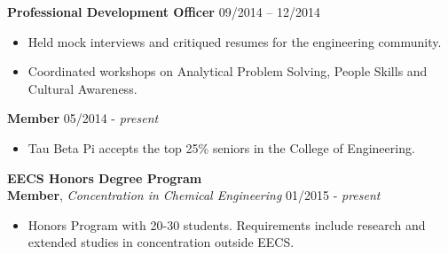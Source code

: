 \documentclass{article}
\begin{document}
\noindent
\textbf{Professional Development Officer}
\hfill 09/2014 -- 12/2014
\begin{itemize}
\vspace{-2.5mm}
\item Held mock interviews and critiqued resumes for the engineering community.
\vspace{-2.5mm}
\item Coordinated workshops on Analytical Problem Solving, People Skills and Cultural Awareness.
\end{itemize}
\vspace{-3.0mm}

\noindent
\textbf{Member}
\hfill 05/2014 - \textit{present}
\begin{itemize}
\vspace{-2.5mm}
\item Tau Beta Pi accepts the top 25\% seniors in the College of Engineering.
\end{itemize}
\vspace{-1.5mm}

\noindent
\textbf{EECS Honors Degree Program} \\
\textbf{Member}, \textit{Concentration in Chemical Engineering}
\hfill 01/2015 - \textit{present}
\begin{itemize}
\vspace{-2.5mm}
\item Honors Program with 20-30 students. Requirements include research and extended studies in concentration outside EECS.
\end{itemize}
\end{document}
